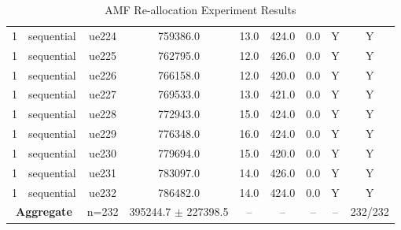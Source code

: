 \begin{table}[ht]
\begin{tabular}{|c|c|c|c|c|c|c|c|c|}
1 & sequential & ue224 & 759386.0 & 13.0 & 424.0 & 0.0 & Y & Y \\
1 & sequential & ue225 & 762795.0 & 12.0 & 426.0 & 0.0 & Y & Y \\
1 & sequential & ue226 & 766158.0 & 12.0 & 420.0 & 0.0 & Y & Y \\
1 & sequential & ue227 & 769533.0 & 13.0 & 421.0 & 0.0 & Y & Y \\
1 & sequential & ue228 & 772943.0 & 15.0 & 424.0 & 0.0 & Y & Y \\
1 & sequential & ue229 & 776348.0 & 16.0 & 424.0 & 0.0 & Y & Y \\
1 & sequential & ue230 & 779694.0 & 15.0 & 420.0 & 0.0 & Y & Y \\
1 & sequential & ue231 & 783097.0 & 14.0 & 426.0 & 0.0 & Y & Y \\
1 & sequential & ue232 & 786482.0 & 14.0 & 424.0 & 0.0 & Y & Y \\
\multicolumn{2}{|c|}{\textbf{Aggregate}} & n=232 & 395244.7 $\pm$ 227398.5 & -- & -- & -- & -- & 232/232 \\
\hline
\end{tabular}
\caption{AMF Re-allocation Experiment Results}
\label{tab:amf_realloc}
\end{table}
